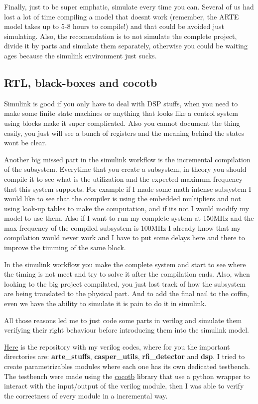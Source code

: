 Finally, just to be super emphatic, simulate every time you can. Several of us had lost a lot of time compiling a model that doesnt work (remember, the ARTE model takes up to 5-8 hours to compile!) and that could be avoided just simulating. Also, the recomendation is to not simulate the complete project, divide it by parts and simulate them separately, otherwise you could be waiting ages because the simulink environment just sucks.

\subsection{RTL, black-boxes and cocotb}
Simulink is good if you only have to deal with DSP stuffs, when you need to make some finite state machines or anything that looks like a control system using blocks make it super complicated. Also you cannot document the thing easily, you just will see a bunch of registers and the meaning behind the states wont be clear.

Another big missed part in the simulink workflow is the incremental compilation of the subsystem. Everytime that you create a subsystem, in theory you should compile it to see what is the utilization and the expected maximum frequency that this system supports. For example if I made some math intense subsystem I would like to see that the compiler is using the embedded multipliers and not using look-up tables to make the computation, and if its not I would modify my model to use them. Also if I want to run my complete system at 150MHz and the max frequency of the compiled subsystem is 100MHz I already know that my compilation would never work and I have to put some delays here and there to improve the timming of the same block. 

In the simulink workflow you make the complete system and start to see where the timing is not meet and try to solve it after the compilation ends. Also, when looking to the big project compilated, you just lost track of how the subsystem are being translated to the physical part. 
And to add the final nail to the coffin, even we have the ability to simulate it is pain to do it in simulink.


All those reasons led me to just code some parts in verilog and simulate them verifying their right behaviour before introducing them into the simulink model.

\href{https://github.com/sebajor/verilog_codes}{Here} is the repository with my verilog codes, where for you the important directories are: \textbf{arte\_stuffs}, \textbf{casper\_utils}, \textbf{rfi\_detector} and \textbf{dsp}.
I tried to create parametrizables modules where each one has its own dedicated testbench. The testbench were made using the \href{https://www.cocotb.org/}{cocotb} library that use a python wrapper to interact with the input/output of the verilog module, then I was able to verify the correctness of every module in a incremental way.

